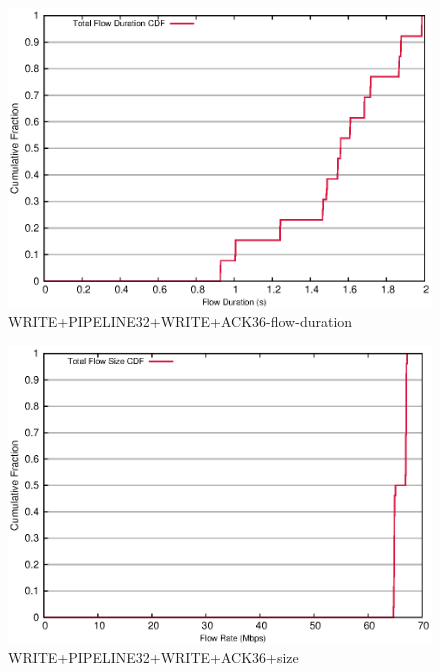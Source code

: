 \documentclass[landscape]{article}
\begin{document}
\begin{figure}[!hbt]
\centering
\includegraphics[width=1\textwidth]{36_32_flow_duration.eps}
\caption{WRITE+PIPELINE32+WRITE+ACK36-flow-duration}

\end{figure}


\newpage

\begin{figure}[!hbt]
\centering
\includegraphics[width=1\textwidth]{36_32_flow_size.eps}
\caption{WRITE+PIPELINE32+WRITE+ACK36+size}

\end{figure}



\newpage
\end{document}
